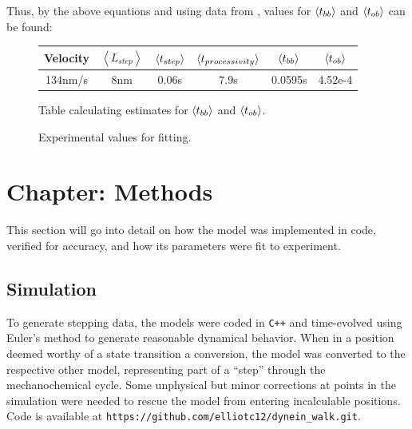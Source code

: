 \documentclass[10pt]{article} %
\begin{document}
Thus, by the above equations and using data from \cite{weihongpaper}, values for $\left<t_{bb}\right>$ and $\left<t_{ob}\right>$ can be found:

\begin{figure}[h]
  \centering
  \begin{tabular}{| c | c | c | c | c | c |}
    \hline
    Velocity & $\left<L_{step}\right>$ & $\left<t_{step}\right>$ & $\left<t_{processivity}\right>$ & $\left<t_{bb}\right>$ & $\left<t_{ob}\right>$ \\ \hline
    134nm/s & 8nm & 0.06s & 7.9s & 0.0595s & 4.52e-4\\ \hline
  \end{tabular}
  \caption{Experimental values for fitting.}{Table calculating estimates for $\left<t_{bb}\right>$ and $\left<t_{ob}\right>$.}
  \label{table:time-parameter-table}
\end{figure}

\section{Chapter: Methods}
This section will go into detail on how the model was implemented in code, verified for accuracy, and how its parameters were fit to experiment.\\

\subsection{Simulation}
To generate stepping data, the models were coded in \verb|C++| and time-evolved using Euler's method to generate reasonable dynamical behavior. When in a position deemed worthy of a state transition a conversion, the model was converted to the respective other model, representing part of a ``step'' through the mechanochemical cycle. Some unphysical but minor corrections at points in the simulation were needed to rescue the model from entering incalculable positions.\\

Code is available at \verb|https://github.com/elliotc12/dynein_walk.git|.


\end{document}

